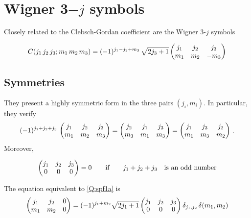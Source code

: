 \section{Wigner 3$-j$ symbols}

Closely related to the Clebsch-Gordan coefficient are the Wigner 3-$j$
symbols

\begin{equation}\label{Q:spf2}
C(j_{1} \, j_{2} \, j_{3}; m_{1} \, m_{2} \, m_{3}) =
(-1)^{j_{1}-j_{2}+m_{3}} \, \sqrt{2 j_{3} + 1} \left( \begin{matrix}j_{1} &
j_{2} & j_{3} \cr m_{1} & m_{2} & -m_{3}
\end{matrix}
\right)
\end{equation}
%

\subsection{Symmetries}
\label{S:3j-symmetries}

They present a highly symmetric form in the three pairs
$(j_{i},m_{i})$. In particular, they verify
\begin{equation} \label{Q:spf3}
(-1)^{j_{1}+j_{2}+j_{3}} \, \left( \begin{matrix}j_{1} & j_{2} & j_{3} \cr
m_{1} & m_{2} & m_{3}
\end{matrix}
\right) =  \left( \begin{matrix}j_{2} & j_{1} & j_{3}
\cr m_{3} & m_{1} & m_{3}
\end{matrix}
\right) = \left( \begin{matrix}j_{1} & j_{3} &
j_{2} \cr m_{1} & m_{3} & m_{2}
\end{matrix}
\right)\, .
\end{equation}
Moreover,

\begin{equation}\label{Q:spf4}
\left( \begin{matrix}j_{1} & j_{2} & j_{3} \cr 0 & 0 & 0
  \end{matrix}
\right)=0 \qquad
\mbox{if} \qquad j_{1}+j_{2} + j_{3}  \quad \mbox{is an odd number}
\end{equation}

  \noindent
The equation equivalent to \ref{Q:spf1a} is
\[
\left( \begin{matrix}j_{1} & j_{2} & 0 \cr  m_{1} & m_{2} & 0
  \end{matrix}
\right)=(-1)^{j_{1} + m_{2}} \sqrt{2 j_{1} +1} \left( \begin{matrix}j_{1} &
j_{2} & j_{3} \cr 0 & 0 & 0
\end{matrix}
\right) \delta_{j_{1},j_{2}} \,
\delta(m_{1},m_{2})
\]

